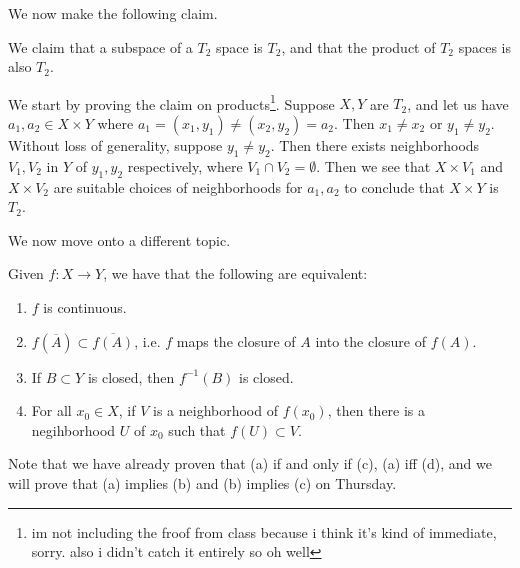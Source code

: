 \noindent We now make the following claim.
\begin{simpleclaim}
    We claim that a subspace of a $T_2$ space is $T_2$, and that the product of $T_2$ spaces is also $T_2$.
\end{simpleclaim}
\noindent We start by proving the claim on products\footnote{im not including the froof from class because i think it's kind of immediate, sorry. also i didn't catch it entirely so oh well}. Suppose $X, Y$ are $T_2$, and let us have $a_1, a_2 \in X \times Y$ where $a_1 = (x_1, y_1) \neq (x_2, y_2) = a_2$. Then $x_1 \neq x_2$ or $y_1 \neq y_2$. Without loss of generality, suppose $y_1 \neq y_2$. Then there exists neighborhoods $V_1, V_2$ in $Y$ of $y_1, y_2$ respectively, where $V_1 \cap V_2 = \emptyset$. Then we see that $X \times V_1$ and $X \times V_2$ are suitable choices of neighborhoods for $a_1, a_2$ to conclude that $X \times Y$ is $T_2$.

\newpage
\noindent We now move onto a different topic.
\begin{simplethm}
    Given $f : X \to Y$, we have that the following are equivalent:
    \begin{enumerate}[label=(\alph*)]
        \item $f$ is continuous.
        \item $f(\overline{A}) \subset \overline{f(A)}$, i.e. $f$ maps the closure of $A$ into the closure of $f(A)$.
        \item If $B \subset Y$ is closed, then $f^{-1}(B)$ is closed.
        \item For all $x_0 \in X$, if $V$ is a neighborhood of $f(x_0)$, then there is a negihborhood $U$ of $x_0$ such that $f(U) \subset V$.
    \end{enumerate}
\end{simplethm}
\noindent Note that we have already proven that (a) if and only if (c), (a) iff (d), and we will prove that (a) implies (b) and (b) implies (c) on Thursday.
